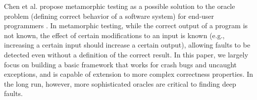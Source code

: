 Chen et al. propose metamorphic testing
\cite{MetaTest,isstamorph,metamorph,chentest} as a possible solution
to the oracle problem (defining correct behavior of a software system)
for end-user programmers \cite{MetamorphEndUser}.  In metamorphic
testing, while the correct output of a program is not known, the
effect of certain modifications to an input is known (e.g., increasing
a certain input should increase a certain output), allowing faults to
be detected even without a definition of the correct result.  In this
paper, we largely focus on building a basic framework that works for
crash bugs and uncaught exceptions, and is capable of
extension to more complex correctness properties.  In the long run, however, more
sophisticated oracles are critical to finding deep faults.
